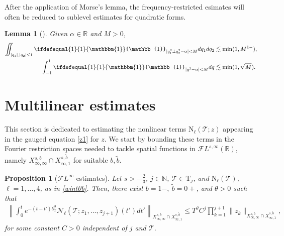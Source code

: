 \documentclass[%
11pt,  reqno]{amsart}
\newcommand{\5}{\textup{V}}
\newcommand{\m}[1]{
	\ifdefequal{#1}{1}
	{\mathbbm{#1}}
	{\mathbb{#1}}
}
\newcommand{\FL}{\mathcal{F} L}
\newcommand{\wt}{\widetilde}
\newcommand{\dx}{\partial_x}
\newtheorem{lemma}[theorem]{Lemma}
\newtheorem{proposition}[theorem]{Proposition}
\theoremstyle{remark}
\newcommand{\R}{\mathbb{R}}
\newcommand{\TT}{\mathcal{T}}
\newcommand{\Tr}{\mathrm{T}}
\newcommand{\bfrak}{\mathfrak{b}}
\newcommand{\gfrak}{\mathfrak{g}}
\newcommand{\ta}{\theta}
\renewcommand{\l}{\ell}
\newcommand{\N}{\mathbb{N}}
\numberwithin{equation}{section}
\numberwithin{theorem}{section}
\newcommand{\NN}{\mathrm{N}}
\newcommand{\Ncal}{\mathcal{N}}
\begin{document}
       After the application of Morse's lemma, the frequency-restricted esimates will often be reduced to sublevel estimates for quadratic forms.
         
		\begin{lemma}[{\cite[Lemma 5]{COS}}]
        \label{lem:quadraticas}
			Given $\alpha\in \R$ and $M>0$, 
			\begin{align}
            \label{eq:posdef}
				\iint_{|q_1|, |q_2|\le 1} \m 1_{|q_1^2\pm q_2^2-\alpha|<M}dq_1dq_2 &\lesssim \min(1,M^{1-} ), \\
                \label{eq:quadratica}
				\int_{-1}^{1} \m 1_{|q^2  -\alpha | < M} dq 
                &\lesssim \min(1,\sqrt M)
                . 
                \\
			\end{align}

		\end{lemma}


\section{Multilinear estimates}\label{sec:multi}

This section is dedicated to 
estimating the nonlinear terms $\NN_\l(\TT;z)$  appearing in the gauged equation \eqref{z1} for $z$. 
We start by bounding these terms in the Fourier restriction spaces needed to tackle spatial functions in $\FL^{s, \infty}(\R)$, namely $X^{s, b}_{\infty, \infty}\cap X^{s, \wt b}_{\infty, 1}$ for suitable $b,\wt b$. 



\begin{proposition}[$\FL^\infty$-estimates]\label{prop:bourgLinfty}
Let $s>-\frac23$, $j \in\N$, $\TT \in \Tr_j$, and $\NN_\l(\TT)$, $\l=1,\dots, 4$, as in \eqref{wint0b}. Then, there exist 
$b=1-,\ \tilde{b}=0+$, and $\ta>0$ such that
	\begin{align}
		\left\| \int_0^t e^{-(t-t')\dx^3}\Ncal_\l(\TT; z_1,\dots, z_{j+1})(t')dt'\right\|_{X^{s,b}_{\infty, \infty}\cap X^{s,\wt b}_{\infty, 1}} \le T^\ta C^j\prod_{k=1}^{j+1}\|z_k\|_{X^{s,b}_{\infty, \infty}\cap X^{s,\tilde{b}}_{\infty,1}}, \label{eq:Linftybourg1} 
	\end{align}
for some constant $C>0$ independent of $j$ and $\TT$. 
\end{proposition}
\end{document}
